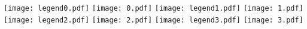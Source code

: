 \documentclass[12pt]{article}
\begin{document}
\begin{center}
\texttt{[image: legend0.pdf]}
\texttt{[image: 0.pdf]}
\texttt{[image: legend1.pdf]}
\texttt{[image: 1.pdf]}
\texttt{[image: legend2.pdf]}
\texttt{[image: 2.pdf]}
\texttt{[image: legend3.pdf]}
\texttt{[image: 3.pdf]}
\end{center}
\end{document}
